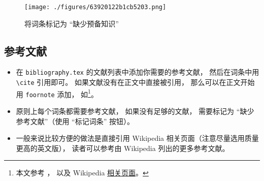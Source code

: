 \begin{figure}[ht]
\centering
\texttt{[image: ./figures/63920122b1cb5203.png]}
\caption{将词条标记为 “缺少预备知识”} \label{fig_WrGuid_2}
\end{figure}

\subsection{参考文献}
\begin{itemize}
\item 在 \verb|bibliography.tex| 的文献列表中添加你需要的参考文献， 然后在词条中用 \verb|\cite| 引用即可。 如果文献没有在正文中直接被引用， 那么可以在正文开始用 \verb|foornote| 添加， 如\footnote{本文参考 \cite{GriffE}， \cite{GriffQ} 以及 Wikipedia \href{https://www.wikipedia.org/}{相关页面}。}。
\item 原则上每个词条都需要参考文献， 如果没有足够的文献， 需要标记为 “缺少参考文献”（使用 “标记词条” 按钮）。
\item 一般来说比较方便的做法是直接引用 Wikipedia 相关页面（注意尽量选用质量更高的英文版）， 读者可以参考由 Wikipedia 列出的更多参考文献。
\end{itemize}
